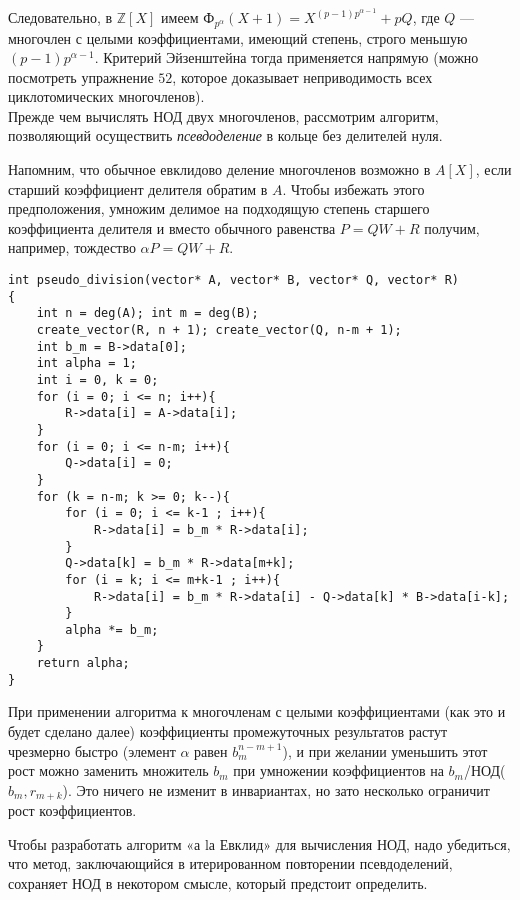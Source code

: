 \documentclass{mai_book}
\begin{document}
\pagebreak

\noindent Следовательно, в $\mathbb{Z}[X]$ имеем Ф$_{p^ \alpha}(X+1) = X^{(p-1)p^{\alpha -1}}+pQ$, где $Q$ —
многочлен с целыми коэффициентами, имеющий степень, строго 
меньшую $(p-1)p^{\alpha -1}$. Критерий Эйзенштейна тогда применяется 
напрямую (можно посмотреть упражнение $52$, которое доказывает 
неприводимость всех циклотомических многочленов).
\\

Прежде чем вычислять НОД двух многочленов, рассмотрим 
алгоритм, позволяющий осуществить \textit{псевдоделение} в кольце без делителей
нуля.

Напомним, что обычное евклидово деление многочленов возможно
в $A[X]$, если старший коэффициент делителя обратим в $A$. Чтобы 
избежать этого предположения, умножим делимое на подходящую 
степень старшего коэффициента делителя и вместо обычного равенства
$P = QW+R$ получим, например, тождество $\alpha P = QW+R$.

\begin{lstlisting}[caption="Евклидово псевдоделение многочленов
над кольцом без делителей нуля"]
int pseudo_division(vector* A, vector* B, vector* Q, vector* R)
{
    int n = deg(A); int m = deg(B);
    create_vector(R, n + 1); create_vector(Q, n-m + 1);
    int b_m = B->data[0];
    int alpha = 1;
    int i = 0, k = 0;
    for (i = 0; i <= n; i++){
        R->data[i] = A->data[i];
    }
    for (i = 0; i <= n-m; i++){
        Q->data[i] = 0;
    }
    for (k = n-m; k >= 0; k--){
        for (i = 0; i <= k-1 ; i++){
            R->data[i] = b_m * R->data[i];
        }
        Q->data[k] = b_m * R->data[m+k];
        for (i = k; i <= m+k-1 ; i++){
            R->data[i] = b_m * R->data[i] - Q->data[k] * B->data[i-k];
        }
        alpha *= b_m;
    }
    return alpha;
}
\end{lstlisting}

При применении алгоритма к многочленам с целыми 
коэффициентами (как это и будет сделано далее) коэффициенты 
промежуточных результатов растут чрезмерно быстро (элемент $\alpha$ равен $b_m^{n-m+1}$), и при желании уменьшить этот рост можно заменить множитель $b_m$ при умножении коэффициентов на $b_m$/НОД($b_m, r_{m+k}$). Это ничего не
изменит в инвариантах, но зато несколько ограничит рост 
коэффициентов.

Чтобы разработать алгоритм «а lа Евклид» для вычисления НОД,
надо убедиться, что метод, заключающийся в итерированном повторении псевдоделений, сохраняет НОД в некотором смысле, который
предстоит определить.
\end{document}
